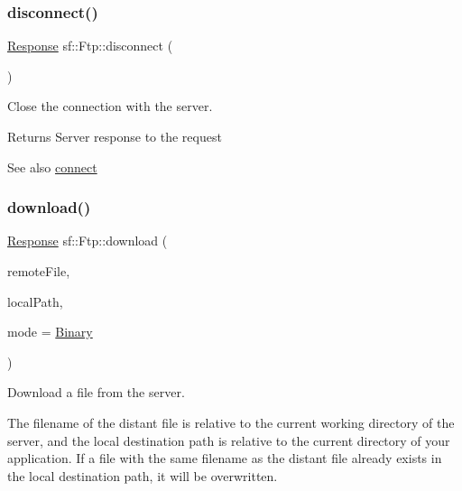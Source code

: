 \subsubsection{\texorpdfstring{disconnect()}{disconnect()}}
{\footnotesize\ttfamily \mbox{\hyperlink{classsf_1_1_ftp_1_1_response}{Response}} sf\+::\+Ftp\+::disconnect (\begin{DoxyParamCaption}{ }\end{DoxyParamCaption})}



Close the connection with the server. 

\begin{DoxyReturn}{Returns}
Server response to the request
\end{DoxyReturn}
\begin{DoxySeeAlso}{See also}
\mbox{\hyperlink{classsf_1_1_ftp_af02fb3de3f450a50a27981961c69c860}{connect}} \begin{DoxyVerb}\end{DoxyVerb}
 
\end{DoxySeeAlso}
\mbox{\label{classsf_1_1_ftp_a20c1600ec5fd6f5a2ad1429ab8aa5df4}} 
\subsubsection{\texorpdfstring{download()}{download()}}
{\footnotesize\ttfamily \mbox{\hyperlink{classsf_1_1_ftp_1_1_response}{Response}} sf\+::\+Ftp\+::download (\begin{DoxyParamCaption}\item[{const std\+::string \&}]{remote\+File,  }\item[{const std\+::string \&}]{local\+Path,  }\item[{\mbox{\hyperlink{classsf_1_1_ftp_a1cd6b89ad23253f6d97e6d4ca4d558cb}{Transfer\+Mode}}}]{mode = {\ttfamily \mbox{\hyperlink{classsf_1_1_ftp_a1cd6b89ad23253f6d97e6d4ca4d558cba6f253b362639fb5e059dc292762a21ee}{Binary}}} }\end{DoxyParamCaption})}



Download a file from the server. 

The filename of the distant file is relative to the current working directory of the server, and the local destination path is relative to the current directory of your application. If a file with the same filename as the distant file already exists in the local destination path, it will be overwritten.


